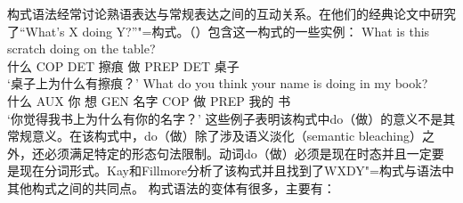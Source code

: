构式语法经常讨论熟语表达与常规表达之间的互动关系。\citet{KF99a}在他们的经典论文中研究了“What's X doing Y?”"=构式。（）包含这一构式的一些实例：
\eal
\ex 
\gll What is this scratch doing on the table?\\
      什么 COP DET 擦痕 做 PREP DET 桌子\\
\glt `桌子上为什么有擦痕？'
\ex 
\gll What do you think your name is doing in my book?\\
      什么 AUX 你 想 GEN 名字 COP 做 PREP 我的 书\\
\glt `你觉得我书上为什么有你的名字？'
\zl
这些例子表明该构式中do（做）的意义不是其常规意义。在该构式中，do（做）除了涉及语义淡化（semantic bleaching）之外，还必须满足特定的形态句法限制。动词do（做）必须是现在时态并且一定要是现在分词形式。Kay和Fillmore分析了该构式并且找到了WXDY"=构式与语法中其他构式之间的共同点。
构式语法的变体有很多，主要有：
